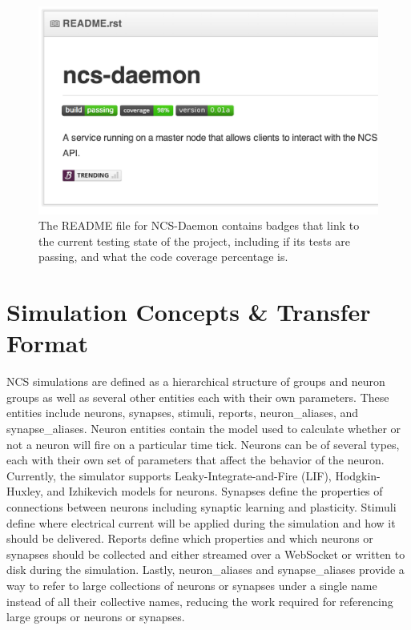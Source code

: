\begin{figure}
\begin{center}
\includegraphics[height=\textheight,width=5in,keepaspectratio]{figures/readme.png}
\caption[NCS-Daemon GitHub README]{The README file for NCS-Daemon contains badges that link to the current testing state of the project, including if its tests are passing, and what the code coverage percentage is.\label{fig:readme}}
\end{center}
\end{figure}

\section{Simulation Concepts \& Transfer Format}

NCS simulations are defined as a hierarchical structure of groups and neuron groups as well as several other entities each with their own parameters. These entities include neurons, synapses, stimuli, reports, neuron\_aliases, and synapse\_aliases. Neuron entities contain the model used to calculate whether or not a neuron will fire on a particular time tick. Neurons can be of several types, each with their own set of parameters that affect the behavior of the neuron. Currently, the simulator supports Leaky-Integrate-and-Fire (LIF), Hodgkin-Huxley, and Izhikevich models for neurons. Synapses define the properties of connections between neurons including synaptic learning and plasticity. Stimuli define where electrical current will be applied during the simulation and how it should be delivered. Reports define which properties and which neurons or synapses should be collected and either streamed over a WebSocket or written to disk during the simulation. Lastly, neuron\_aliases and synapse\_aliases provide a way to refer to large collections of neurons or synapses under a single name instead of all their collective names, reducing the work required for referencing large groups or neurons or synapses.

